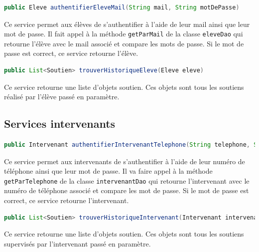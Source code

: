 \begin{lstlisting}[language = Java]
public Eleve authentifierEleveMail(String mail, String motDePasse)
\end{lstlisting}
Ce service permet aux élèves de s'authentifier à l'aide de leur mail ainsi que leur mot de passe. Il fait appel à la méthode \texttt{getParMail} de la classe \texttt{eleveDao} qui retourne l'élève avec le mail associé et compare les mots de passe. Si le mot de passe est correct, ce service retourne l'élève.

\begin{lstlisting}[language = Java]
public List<Soutien> trouverHistoriqueEleve(Eleve eleve)
\end{lstlisting}
Ce service retourne une liste d'objets soutien. Ces objets sont tous les soutiens réalisé par l'élève passé en paramètre.


\subsection{Services intervenants}
\begin{lstlisting}[language = Java]
public Intervenant authentifierIntervenantTelephone(String telephone, String motDePasse)
\end{lstlisting}
Ce service permet aux intervenants de s'authentifier à l'aide de leur numéro de téléphone ainsi que leur mot de passe. Il va faire appel à la méthode \texttt{getParTelephone} de la classe \texttt{intervenantDao} qui retourne l'intervenant avec le numéro de téléphone associé et compare les mot de passe. Si le mot de passe est correct, ce service retourne l'intervenant.

\begin{lstlisting}[language = Java]
public List<Soutien> trouverHistoriqueIntervenant(Intervenant intervenant)
\end{lstlisting}
Ce service retourne une liste d'objets soutien. Ces objets sont tous les soutiens supervisés par l'intervenant passé en paramètre.

